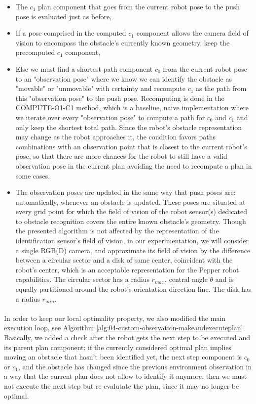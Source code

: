 \begin{itemize}
  \item The $c_{1}$ plan component that goes from the current robot pose to the push pose is evaluated just as before,
  \item If a pose comprised in the computed $c_{1}$ component allows the camera field of vision to encompass the obstacle's currently known geometry, keep the precomputed $c_{1}$ component,
  \item Else we must find a shortest path component $c_{0}$ from the current robot pose to an "observation pose" where we know we can identify the obstacle as "movable" or "unmovable" with certainty and recompute $c_{1}$ as the path from this "observation pose" to the push pose. Recomputing is done in the COMPUTE-O1-C1 method, which is a baseline, naive implementation where we iterate over every "observation pose" to compute a path for $c_{0}$ and $c_{1}$ and only keep the shortest total path. Since the robot's obstacle representation may change as the robot approaches it, the condition favors paths combinations with an observation point that is closest to the current robot's pose, so that there are more chances for the robot to still have a valid observation pose in the current plan avoiding the need to recompute a plan in some cases.
  \item The observation poses are updated in the same way that push poses are: automatically, whenever an obstacle is updated. These poses are situated at every grid point for which the field of vision of the robot sensor(s) dedicated to obstacle recognition covers the entire known obstacle's geometry. Though the presented algorithm is not affected by the representation of the identification sensor's field of vision, in our experimentation, we will consider a single RGB(D) camera, and approximate its field of vision by the difference between a circular sector and a disk of same center, coincident with the robot's center, which is an acceptable representation for the Pepper robot capabilities. The circular sector has a radius $r_{max}$, central angle $\theta$ and is equally partitioned around the robot's orientation direction line. The disk has a radius $r_{min}$.
\end{itemize}

\paragraph{} In order to keep our local optimality property, we also modified the main execution loop, see Algorithm \ref{alg:04-custom-observation-makeandexecuteplan}. Basically, we added a check after the robot gets the next step to be executed and its parent plan component: if the currently considered optimal plan implies moving an obstacle that hasn't been identified yet, the next step component is $c_{0}$ or $c_{1}$, and the obstacle has changed since the previous environment observation in a way that the current plan does not allow to identify it anymore, then we must not execute the next step but re-evalutate the plan, since it may no longer be optimal.

